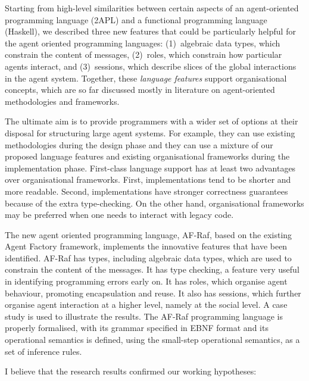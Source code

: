 \documentclass[a4paper,12pt,oneside,fleqn]{book} %
\begin{document}
Starting from high-level similarities between certain aspects of an
agent-oriented programming language (2APL) and a functional programming
language (Haskell), we described three new features that could be
particularly helpful for the agent oriented programming languages:
(1)~algebraic data types, which constrain the content of messages,
(2)~roles, which constrain how particular agents interact, and
(3)~sessions, which describe slices of the global interactions in the agent
system. Together, these \emph{language features} support organisational
concepts, which are so far discussed mostly in literature on
agent-oriented methodologies and frameworks.

The ultimate aim is to provide programmers with a wider set of options at
their disposal for structuring large agent systems. For example, they can
use existing methodologies during the design phase and they can use a
mixture of our proposed language features and existing organisational
frameworks during the implementation phase. First-class language support
has at least two advantages over organisational frameworks. First,
implementations tend to be shorter and more readable. Second,
implementations have stronger correctness guarantees because of the extra
type-checking. On the other hand, organisational frameworks may be
preferred when one needs to interact with legacy code.

The new agent oriented programming language, AF-Raf, based on the existing
Agent Factory framework, implements the innovative features that have been
identified. AF-Raf has types, including algebraic data types, which are
used to constrain the content of the messages. It has type checking, a
feature very useful in identifying programming errors early on. It has
roles, which organise agent behaviour, promoting encapsulation and reuse.
It also has sessions, which further organise agent interaction at a higher
level, namely at the social level. A case study is used to illustrate the
results. The AF-Raf programming language is properly formalised, with its
grammar specified in EBNF format and its operational semantics is defined,
using the small-step operational semantics, as a set of inference rules.

I believe that the research results confirmed our working hypotheses:
\end{document}
